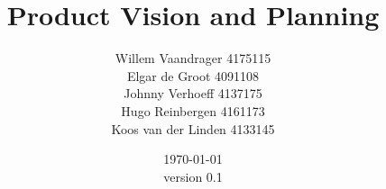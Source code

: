 \begin{titlepage}
\title{{\huge Product Vision and Planning}}
\author{Willem Vaandrager 4175115 \\
Elgar de Groot 4091108 \\
Johnny Verhoeff 4137175 \\
Hugo Reinbergen 4161173 \\
Koos van der Linden 4133145}
\vfill
\date{\today\\ {\small version 0.1}}
\maketitle
\end{titlepage}